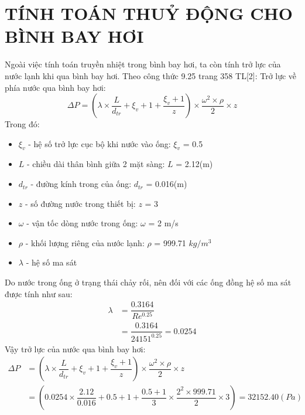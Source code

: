 \section{TÍNH TOÁN THUỶ ĐỘNG CHO BÌNH BAY HƠI}
Ngoài việc tính toán truyền nhiệt trong bình bay hơi, ta còn tính trở lực của nước lạnh khi qua bình bay hơi. Theo công thức 9.25 trang 358 TL[2]:
Trở lực về phía nước qua bình bay hơi:
\begin{equation*}
	\Delta P = \left(\lambda\times\dfrac{L}{d_{tr}} +\xi_{v} + 1 + \dfrac{\xi_{v} + 1}{z}\right)\times \dfrac{\omega^2\times\rho}{2}\times z
\end{equation*}
Trong đó:
\begin{itemize}
	\item $\xi_{v}$ - hệ số trở lực cục bộ khi nước vào ống: $\xi_{v}$ = 0.5
	\item $L$ - chiều dài thân bình giữa 2 mặt sàng: $L$ = 2.12(m)
	\item $d_{tr}$ - đường kính trong của ống: $d_{tr}$ = 0.016(m)
	\item $z$ - số đường nước trong thiết bị: $z$ = 3
	\item $\omega$ - vận tốc dòng nước trong ống: $\omega$ = 2 m/s
	\item $\rho$ - khối lượng riêng của nước lạnh: $\rho$ = 999.71 $kg/m^3$
	\item $\lambda$ - hệ số ma sát	
\end{itemize}
Do nước trong ống ở trạng thái chảy rối, nên đối với các ống đồng hệ số ma sát được tính như sau:
\begin{equation*}
	\begin{split}
		\lambda &= \dfrac{0.3164}{Re^{0.25}}\\
		&=  \dfrac{0.3164}{24151^{0.25}}=0.0254
	\end{split}
\end{equation*}
Vậy trở lực của nước qua bình bay hơi:
\begin{equation*}
	\begin{split}
		\Delta P &= \left(\lambda\times\dfrac{L}{d_{tr}} +\xi_{v} + 1 + \dfrac{\xi_{v} + 1}{z}\right)\times \dfrac{\omega^2\times\rho}{2}\times z\\
		&=  (0.0254 \times \dfrac{2.12}{0.016}+0.5+1+ \dfrac{0.5+1}{3} \times \dfrac{2^2 \times 999.71}{2} \times 3) = 32152.40(Pa)
	\end{split}
\end{equation*}
